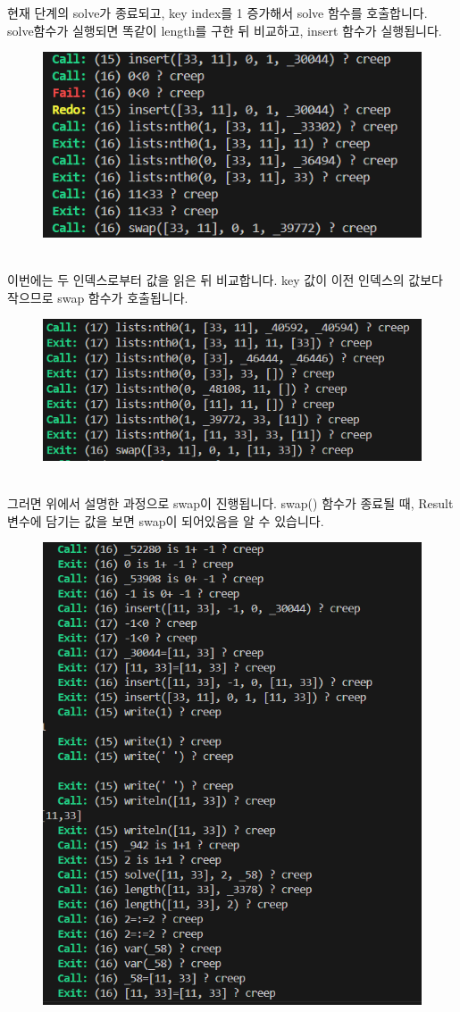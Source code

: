 \documentclass{article}
\begin{document}
현재 단계의 solve가 종료되고, key index를 1 증가해서 solve 함수를 호출합니다.\\
solve함수가 실행되면 똑같이 length를 구한 뒤 비교하고, insert 함수가 실행됩니다.\\
\begin{figure}[!htb]
    \centering
    \includegraphics[width=0.8\linewidth]{hw5a_4.png}
\end{figure}\\
이번에는 두 인덱스로부터 값을 읽은 뒤 비교합니다. key 값이 이전 인덱스의 값보다 작으므로 swap 함수가 호출됩니다.\\
\begin{figure}[!htb]
    \centering
    \includegraphics[width=0.8\linewidth]{hw5a_5.png}
\end{figure}\\
그러면 위에서 설명한 과정으로 swap이 진행됩니다. swap() 함수가 종료될 때, Result 변수에 담기는 값을 보면 swap이 되어있음을 알 수 있습니다.\\
\begin{figure}[!h]
    \centering
    \includegraphics[width=0.8\linewidth]{hw5a_6.png}
\end{figure}\\
\end{document}
